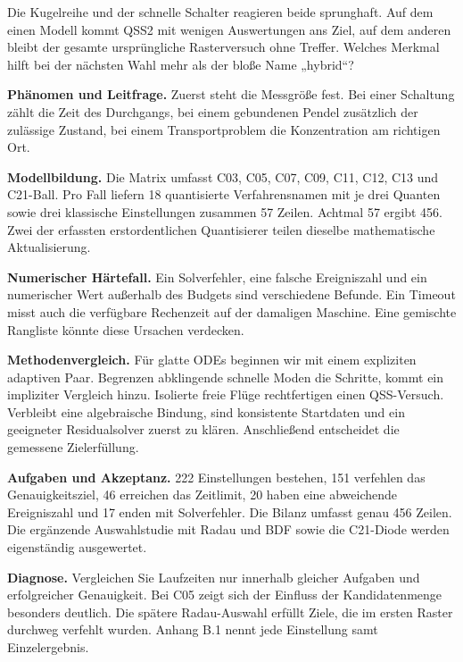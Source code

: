 Die Kugelreihe und der schnelle Schalter reagieren beide sprunghaft. Auf dem einen Modell kommt QSS2 mit wenigen Auswertungen ans Ziel, auf dem anderen bleibt der gesamte ursprüngliche Rasterversuch ohne Treffer. Welches Merkmal hilft bei der nächsten Wahl mehr als der bloße Name „hybrid“?
\par\textsf{\bfseries\color{sea}Phänomen und Leitfrage.} Zuerst steht die Messgröße fest. Bei einer Schaltung zählt die Zeit des Durchgangs, bei einem gebundenen Pendel zusätzlich der zulässige Zustand, bei einem Transportproblem die Konzentration am richtigen Ort.
\par\textsf{\bfseries\color{sea}Modellbildung.} Die Matrix umfasst C03, C05, C07, C09, C11, C12, C13 und C21-Ball. Pro Fall liefern 18 quantisierte Verfahrensnamen mit je drei Quanten sowie drei klassische Einstellungen zusammen 57 Zeilen. Achtmal 57 ergibt 456. Zwei der erfassten erstordentlichen Quantisierer teilen dieselbe mathematische Aktualisierung.
\par\textsf{\bfseries\color{sea}Numerischer Härtefall.} Ein Solverfehler, eine falsche Ereigniszahl und ein numerischer Wert außerhalb des Budgets sind verschiedene Befunde. Ein Timeout misst auch die verfügbare Rechenzeit auf der damaligen Maschine. Eine gemischte Rangliste könnte diese Ursachen verdecken.
\par\textsf{\bfseries\color{sea}Methodenvergleich.} Für glatte ODEs beginnen wir mit einem expliziten adaptiven Paar. Begrenzen abklingende schnelle Moden die Schritte, kommt ein impliziter Vergleich hinzu. Isolierte freie Flüge rechtfertigen einen QSS-Versuch. Verbleibt eine algebraische Bindung, sind konsistente Startdaten und ein geeigneter Residualsolver zuerst zu klären. Anschließend entscheidet die gemessene Zielerfüllung.
\par\textsf{\bfseries\color{sea}Aufgaben und Akzeptanz.} 222 Einstellungen bestehen, 151 verfehlen das Genauigkeitsziel, 46 erreichen das Zeitlimit, 20 haben eine abweichende Ereigniszahl und 17 enden mit Solverfehler. Die Bilanz umfasst genau 456 Zeilen. Die ergänzende Auswahlstudie mit Radau und BDF sowie die C21-Diode werden eigenständig ausgewertet.
\par\textsf{\bfseries\color{sea}Diagnose.} Vergleichen Sie Laufzeiten nur innerhalb gleicher Aufgaben und erfolgreicher Genauigkeit. Bei C05 zeigt sich der Einfluss der Kandidatenmenge besonders deutlich. Die spätere Radau-Auswahl erfüllt Ziele, die im ersten Raster durchweg verfehlt wurden. Anhang B.1 nennt jede Einstellung samt Einzelergebnis.


